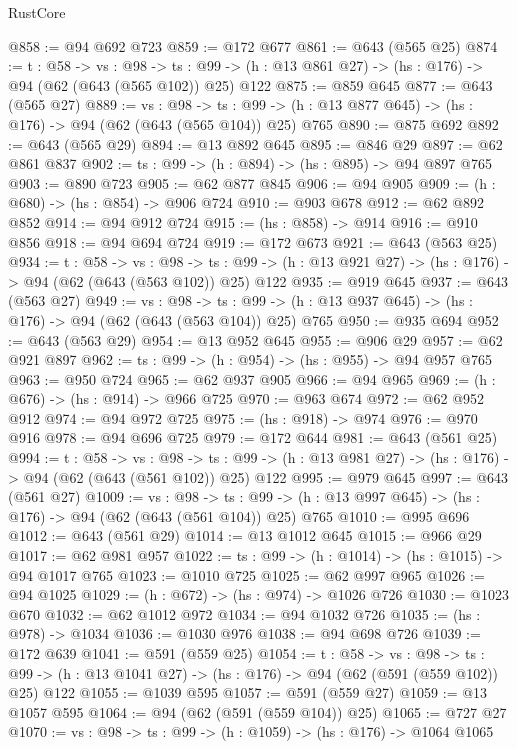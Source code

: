 \begin{lexlean}{RustCore}
\begin{coremodule}
@858 := @94 @692 @723
@859 := @172 @677
@861 := @643 (@565 @25)
@874 := {t : @58} ->
  {vs : @98} ->
  {ts : @99} -> (h : @13 @861 @27) -> (hs : @176) -> @94 (@62 (@643 (@565 @102)) @25) @122
@875 := @859 @645
@877 := @643 (@565 @27)
@889 := {vs : @98} ->
  {ts : @99} -> (h : @13 @877 @645) -> (hs : @176) -> @94 (@62 (@643 (@565 @104)) @25) @765
@890 := @875 @692
@892 := @643 (@565 @29)
@894 := @13 @892 @645
@895 := @846 @29
@897 := @62 @861 @837
@902 := {ts : @99} -> (h : @894) -> (hs : @895) -> @94 @897 @765
@903 := @890 @723
@905 := @62 @877 @845
@906 := @94 @905
@909 := (h : @680) -> (hs : @854) -> @906 @724
@910 := @903 @678
@912 := @62 @892 @852
@914 := @94 @912 @724
@915 := (hs : @858) -> @914
@916 := @910 @856
@918 := @94 @694 @724
@919 := @172 @673
@921 := @643 (@563 @25)
@934 := {t : @58} ->
  {vs : @98} ->
  {ts : @99} -> (h : @13 @921 @27) -> (hs : @176) -> @94 (@62 (@643 (@563 @102)) @25) @122
@935 := @919 @645
@937 := @643 (@563 @27)
@949 := {vs : @98} ->
  {ts : @99} -> (h : @13 @937 @645) -> (hs : @176) -> @94 (@62 (@643 (@563 @104)) @25) @765
@950 := @935 @694
@952 := @643 (@563 @29)
@954 := @13 @952 @645
@955 := @906 @29
@957 := @62 @921 @897
@962 := {ts : @99} -> (h : @954) -> (hs : @955) -> @94 @957 @765
@963 := @950 @724
@965 := @62 @937 @905
@966 := @94 @965
@969 := (h : @676) -> (hs : @914) -> @966 @725
@970 := @963 @674
@972 := @62 @952 @912
@974 := @94 @972 @725
@975 := (hs : @918) -> @974
@976 := @970 @916
@978 := @94 @696 @725
@979 := @172 @644
@981 := @643 (@561 @25)
@994 := {t : @58} ->
  {vs : @98} ->
  {ts : @99} -> (h : @13 @981 @27) -> (hs : @176) -> @94 (@62 (@643 (@561 @102)) @25) @122
@995 := @979 @645
@997 := @643 (@561 @27)
@1009 := {vs : @98} ->
  {ts : @99} -> (h : @13 @997 @645) -> (hs : @176) -> @94 (@62 (@643 (@561 @104)) @25) @765
@1010 := @995 @696
@1012 := @643 (@561 @29)
@1014 := @13 @1012 @645
@1015 := @966 @29
@1017 := @62 @981 @957
@1022 := {ts : @99} -> (h : @1014) -> (hs : @1015) -> @94 @1017 @765
@1023 := @1010 @725
@1025 := @62 @997 @965
@1026 := @94 @1025
@1029 := (h : @672) -> (hs : @974) -> @1026 @726
@1030 := @1023 @670
@1032 := @62 @1012 @972
@1034 := @94 @1032 @726
@1035 := (hs : @978) -> @1034
@1036 := @1030 @976
@1038 := @94 @698 @726
@1039 := @172 @639
@1041 := @591 (@559 @25)
@1054 := {t : @58} ->
  {vs : @98} ->
  {ts : @99} -> (h : @13 @1041 @27) -> (hs : @176) -> @94 (@62 (@591 (@559 @102)) @25) @122
@1055 := @1039 @595
@1057 := @591 (@559 @27)
@1059 := @13 @1057 @595
@1064 := @94 (@62 (@591 (@559 @104)) @25)
@1065 := @727 @27
@1070 := {vs : @98} -> {ts : @99} -> (h : @1059) -> (hs : @176) -> @1064 @1065

\end{coremodule}
\end{lexlean}
